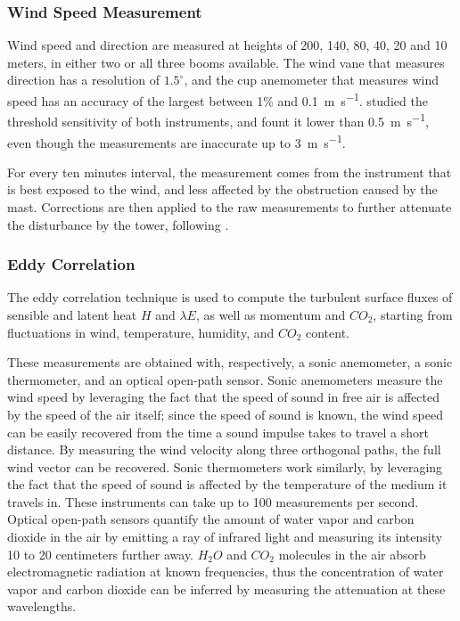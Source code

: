 \documentclass[a4paper]{book}
\begin{document}
\subsubsection{Wind Speed Measurement}
Wind speed and direction are measured at heights of 200, 140, 80, 40, 20 and 10 meters, in either two or all three booms available. The wind vane that measures direction has a resolution of $1.5^\circ$, and the cup anemometer that measures wind speed has an accuracy of the largest between 1\% and \SI{0.1}{\meter\per\second}. \cite{windinstr} studied the threshold sensitivity of both instruments, and fount it lower than \SI{0.5}{\meter\per\second}, even though the measurements are inaccurate up to \SI{3}{\meter\per\second}.

For every ten minutes interval, the measurement comes from the instrument that is best exposed to the wind, and less affected by the obstruction caused by the mast. Corrections are then applied to the raw measurements to further attenuate the disturbance by the tower, following \cite{winddistortion}.

\subsubsection{Eddy Correlation}
\label{sec:eddy_correlation}
The eddy correlation technique is used to compute the turbulent surface fluxes of sensible and latent heat $H$ and $\lambda E$, as well as momentum and $CO_2$, starting from fluctuations in wind, temperature, humidity, and $CO_2$ content.

These measurements are obtained with, respectively, a sonic anemometer, a sonic thermometer, and an optical open-path sensor. Sonic anemometers measure the wind speed by leveraging the fact that the speed of sound in free air is affected by the speed of the air itself; since the speed of sound is known, the wind speed can be easily recovered from the time a sound impulse takes to travel a short distance. By measuring the wind velocity along three orthogonal paths, the full wind vector can be recovered. Sonic thermometers work similarly, by leveraging the fact that the speed of sound is affected by the temperature of the medium it travels in. These instruments can take up to 100 measurements per second. Optical open-path sensors quantify the amount of water vapor and carbon dioxide in the air by emitting a ray of infrared light and measuring its intensity 10 to 20 centimeters further away. $H_2O$ and $CO_2$ molecules in the air absorb electromagnetic radiation at known frequencies, thus the concentration of water vapor and carbon dioxide can be inferred by measuring the attenuation at these wavelengths.
\end{document}
